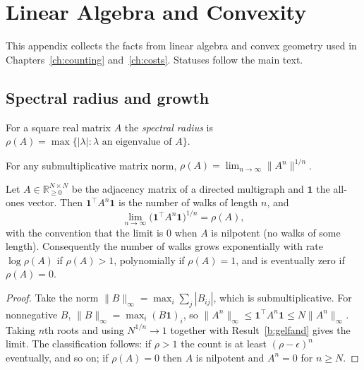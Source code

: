 \chapter{Linear Algebra and Convexity}\label{app:linalg}

This appendix collects the facts from linear algebra and convex geometry used in Chapters~\ref{ch:counting} and~\ref{ch:costs}. Statuses follow the main text.

\section{Spectral radius and growth}

For a square real matrix $A$ the \emph{spectral radius} is $\rho(A)=\max\{|\lambda|:\lambda\text{ an eigenvalue of }A\}$.

\begin{established}\label{b:gelfand}
For any submultiplicative matrix norm, $\rho(A)=\lim_{n\to\infty}\|A^n\|^{1/n}$.
\end{established}

\begin{newresult}\label{b:walks}
Let $A\in\mathbb R_{\ge0}^{N\times N}$ be the adjacency matrix of a directed multigraph and $\mathbf 1$ the all-ones vector. Then $\mathbf 1^{\top}A^n\mathbf 1$ is the number of walks of length $n$, and
\[
\lim_{n\to\infty}\bigl(\mathbf 1^\top A^n\mathbf 1\bigr)^{1/n}=\rho(A),
\]
with the convention that the limit is $0$ when $A$ is nilpotent (no walks of some length). Consequently the number of walks grows exponentially with rate $\log\rho(A)$ if $\rho(A)>1$, polynomially if $\rho(A)=1$, and is eventually zero if $\rho(A)=0$.
\end{newresult}
\begin{proof}
Take the norm $\|B\|_\infty=\max_i\sum_j|B_{ij}|$, which is submultiplicative. For nonnegative $B$, $\|B\|_\infty=\max_i(B\mathbf 1)_i$, so $\|A^n\|_\infty\le\mathbf 1^\top A^n\mathbf 1\le N\|A^n\|_\infty$. Taking $n$th roots and using $N^{1/n}\to1$ together with Result~\ref{b:gelfand} gives the limit. The classification follows: if $\rho>1$ the count is at least $(\rho-\epsilon)^n$ eventually, and so on; if $\rho(A)=0$ then $A$ is nilpotent and $A^n=0$ for $n\ge N$.
\end{proof}

